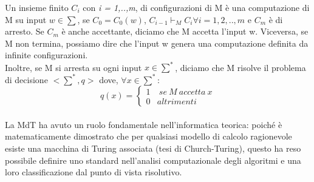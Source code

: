 Un insieme finito ${C}_{i}$ con \textit{i = {1,..,m}}, di configurazioni di M è una computazione di M su input $w \in \sum$, se ${C}_{0} = {C}_{0}(w)$, ${C}_{i-1} \vdash_{M} {C}_{i} \forall i = 1,2,..,m$ e ${C}_{m}$ è di arresto. Se ${C}_{m}$ è anche accettante, diciamo che M accetta l'input w. Viceversa, se M non termina, possiamo dire che l'input w genera una computazione definita da infinite configurazioni.\\
Inoltre, se M si arresta su ogni input $x \in \sum^*$, diciamo che M risolve il problema di decisione $<\sum^*, q>$ dove, $\forall x \in \sum^*$:
\[q(x) =\left\{
  \begin{array}{lr}
    1 & \ se \ M  \ accetta \ x \\
    0 & altrimenti
  \end{array}
\right.
\]\\
La MdT ha avuto un ruolo fondamentale nell'informatica teorica: poiché è matematicamente dimostrato che per qualsiasi modello di calcolo ragionevole esiste una macchina di Turing associata (tesi di Church-Turing), questo ha reso possibile definire uno standard nell'analisi computazionale degli algoritmi e una loro classificazione dal punto di vista risolutivo.
